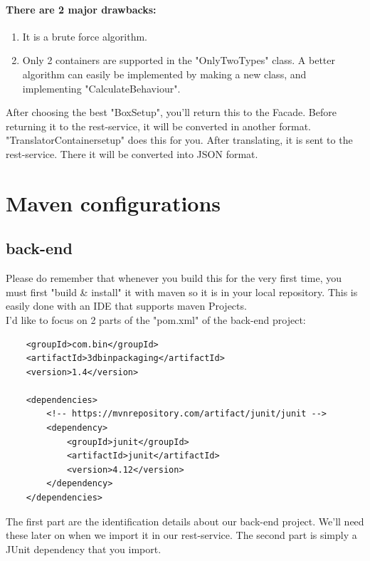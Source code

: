 \documentclass[a4paper,12pt]{article}
\begin{document}
\paragraph{There are 2 major drawbacks:}
\begin{enumerate}
	\item It is a brute force algorithm.
	\item Only 2 containers are supported in the "OnlyTwoTypes" class. A better algorithm can easily be implemented by making a new class, and implementing "CalculateBehaviour". 
\end{enumerate}

After choosing the best "BoxSetup", you'll return this to the Facade. Before returning it to the rest-service, it will be converted in another format. "TranslatorContainersetup" does this for you. After translating, it is sent to the rest-service. There it will be converted into JSON format.

\section{Maven configurations}
\subsection{back-end}
Please do remember that whenever you build this for the very first time, you must first "build \& install" it with maven so it is in your local repository. This is easily done with an IDE that supports maven Projects. \\

I'd like to focus on 2 parts of the "pom.xml" of the back-end project: 
\lstset{language=xml}
\begin{lstlisting}
	<groupId>com.bin</groupId>
	<artifactId>3dbinpackaging</artifactId>
	<version>1.4</version>
	
	<dependencies>
		<!-- https://mvnrepository.com/artifact/junit/junit -->
		<dependency>
			<groupId>junit</groupId>
			<artifactId>junit</artifactId>
			<version>4.12</version>
		</dependency>
	</dependencies>
\end{lstlisting}

The first part are the identification details about our back-end project. We'll need these later on when we import it in our rest-service. The second part is simply a JUnit dependency that you import.

\pagebreak
\end{document}
